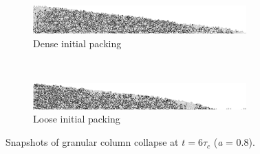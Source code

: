\begin{figure}[bhp]
\centering
\begin{subfigure}[b]{\textwidth}
\centering
\includegraphics[width=0.9\textwidth]{dense_a08_r6_final}
\caption{Dense initial packing}
\label{fig:dense_a08_r6_final}
\end{subfigure}
\\
\begin{subfigure}[b]{\textwidth}
\centering
\includegraphics[width=0.9\textwidth]{loose_a08_r6_final}
\caption{Loose initial packing}
\label{fig:loose_a08_r6_final}
\end{subfigure}
\caption{Snapshots of granular column collapse at $t = 6 \tau_c$ (\textit{a} = 
0.8).}
\label{fig:density_r6}
\end{figure}


